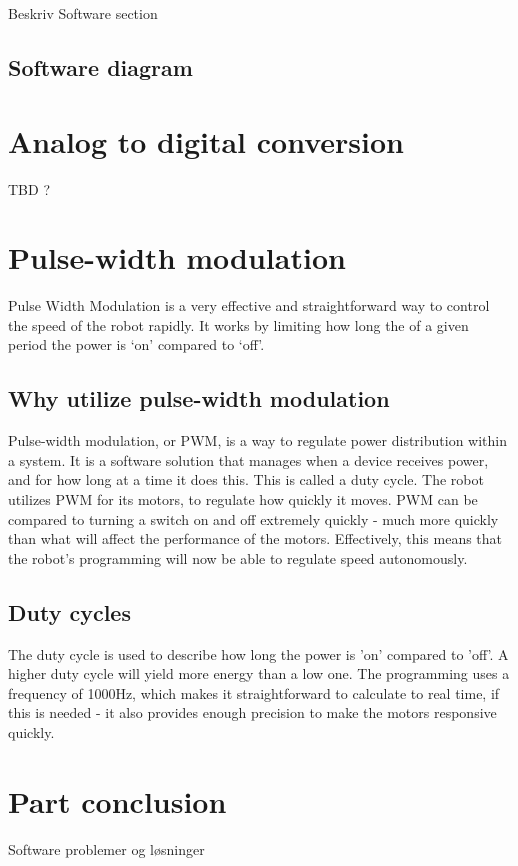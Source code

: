 
Beskriv Software section

\subsection{Software diagram}

\section{Analog to digital conversion}
TBD ?

\section{Pulse-width modulation}
Pulse Width Modulation is a very effective and straightforward way to control the speed of the robot rapidly. It works by limiting how long the of a given period the power is ‘on’ compared to ‘off’.

\subsection {Why utilize pulse-width modulation}

Pulse-width modulation, or PWM, is a way to regulate power distribution within a system. It is a software solution that manages when a device receives power, and for how long at a time it does this. This is called a duty cycle. The robot utilizes PWM for its motors, to regulate how quickly it moves. PWM can be compared to turning a switch on and off extremely quickly - much more quickly than what will affect the performance of the motors. Effectively, this means that the robot's programming will now be able to regulate speed autonomously. 
 
\subsection {Duty cycles}

The duty cycle is used to describe how long the power is 'on' compared to 'off'. A higher duty cycle will yield more energy than a low one. The programming uses a frequency of 1000Hz, which makes it straightforward to calculate to real time, if this is needed - it also provides enough precision to make the motors responsive quickly.

\section{Part conclusion}
Software problemer og løsninger
